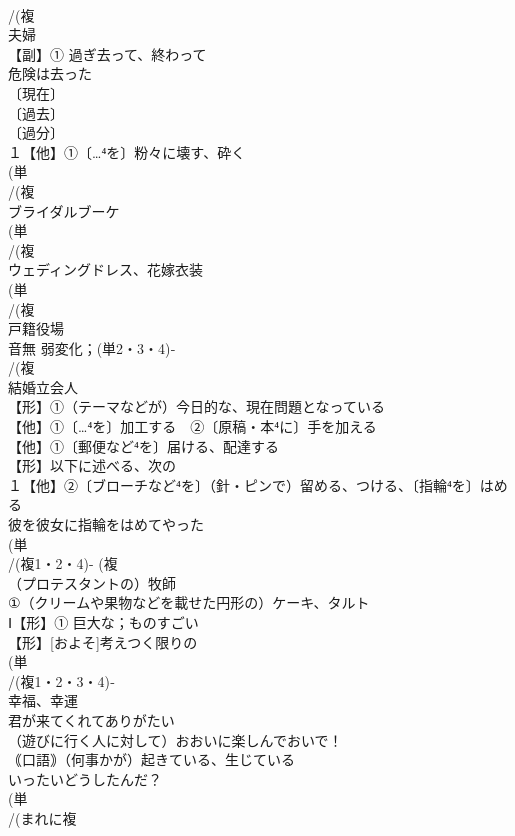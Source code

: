 \documentclass[8pt]{extreport}
\begin{document}
\begin{CJK}{UTF8}{min}
\\	/(複
\\	夫婦 
\\	【副】① 過ぎ去って、終わって 
\\	危険は去った
\\	〔現在〕
\\	〔過去〕
\\	〔過分〕
\\	１【他】①〔…⁴を〕粉々に壊す、砕く 
\\	(単
\\	/(複
\\	ブライダルブーケ 
\\	(単
\\	/(複
\\	ウェディングドレス、花嫁衣装 
\\	(単
\\	/(複
\\	戸籍役場 
\\	音無	弱変化；(単2・3・4)‐
\\	/(複
\\	結婚立会人 
\\	【形】①（テーマなどが）今日的な、現在問題となっている
\\	【他】①〔…⁴を〕加工する　②〔原稿・本⁴に〕手を加える
\\	【他】①〔郵便など⁴を〕届ける、配達する 
\\	【形】以下に述べる、次の 
\\	１【他】②〔ブローチなど⁴を〕（針・ピンで）留める、つける、〔指輪⁴を〕はめる　
\\	彼を彼女に指輪をはめてやった
\\	(単
\\	/(複1・2・4)- (複
\\	（プロテスタントの）牧師 
\\	①（クリームや果物などを載せた円形の）ケーキ、タルト
\\	Ⅰ【形】① 巨大な；ものすごい 
\\	【形】[およそ]考えつく限りの 
\\	(単
\\	/(複1・2・3・4)‐ 
\\	幸福、幸運 
\\	君が来てくれてありがたい
\\	（遊びに行く人に対して）おおいに楽しんでおいで！
\\	｟口語｠（何事かが）起きている、生じている 
\\	いったいどうしたんだ？
\\	(単
\\	/(まれに複

\end{CJK}
\end{document}
